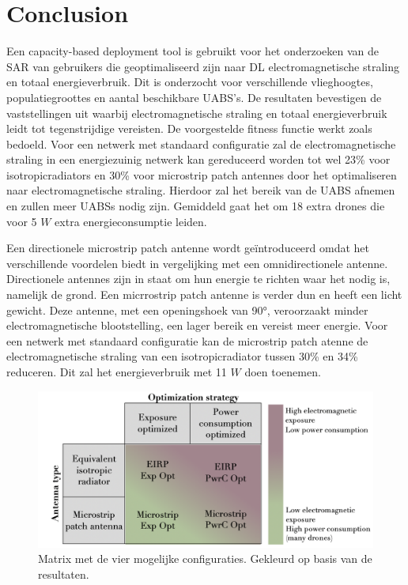 \documentclass[twocolumn]{phdsymp_dutch}
\begin{document}
\section{Conclusion}

Een capacity-based deployment tool is gebruikt voor het onderzoeken van de 
\gls{SAR} van gebruikers die geoptimaliseerd zijn naar 
 \gls{DL} electromagnetische straling en totaal energieverbruik.
 Dit is onderzocht voor verschillende vlieghoogtes, populatiegroottes en aantal beschikbare \gls{UABS}'s.
De resultaten bevestigen de vaststellingen uit \cite{J1}  waarbij electromagnetische straling en totaal energieverbruik
leidt tot tegenstrijdige vereisten. De voorgestelde fitness functie werkt zoals bedoeld.
Voor een netwerk met standaard configuratie zal de electromagnetische straling in een 
energiezuinig netwerk kan gereduceerd worden tot wel 
23\% voor \gls{isotropicradiator}s en 30\% voor microstrip patch antennes
door het optimaliseren naar electromagnetische straling. Hierdoor zal het bereik van de 
 \gls{UABS} afnemen en zullen meer \gls{UABS}s nodig zijn.
Gemiddeld gaat het om 18 extra drones die voor 5 $W$  extra energieconsumptie leiden.

Een directionele microstrip patch antenne wordt geïntroduceerd omdat het verschillende voordelen biedt 
in vergelijking met een omnidirectionele antenne. Directionele antennes zijn in staat om hun energie te richten waar het nodig is, namelijk de grond.
Een micrrostrip patch antenne is verder dun en heeft een licht gewicht. Deze antenne, met een openingshoek van \ang{90}, veroorzaakt 
minder electromagnetische blootstelling, een lager bereik en vereist meer energie.
Voor een netwerk met standaard configuratie kan de microstrip patch atenne de electromagnetische
straling van een \gls{isotropicradiator} tussen 30\% en 34\% reduceren. Dit zal het energieverbruik met 11 $W$ doen toenemen.
\begin{figure}[hb!]
\centering
  \includegraphics[width=0.8\linewidth]{../images/fourCasesMatrixSol.png}
  \caption{Matrix met de vier mogelijke configuraties. Gekleurd op basis van de resultaten.}
  \label{fig:resultIllustration}
\end{figure}
\end{document}
